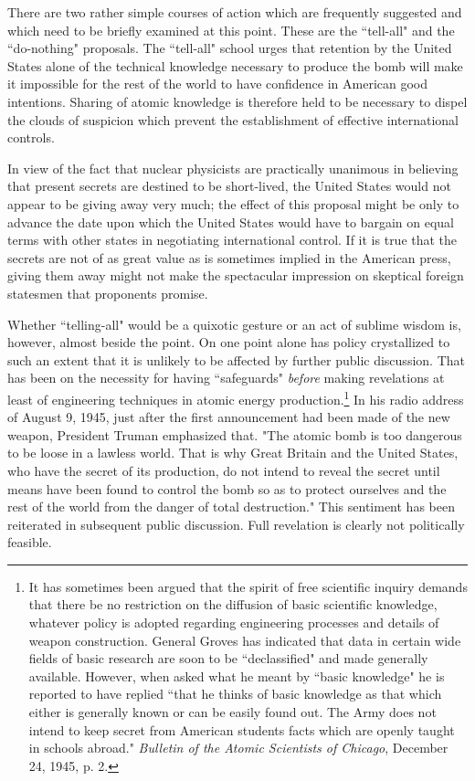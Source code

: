 There are two rather simple courses of action which are frequently suggested and which need to be briefly examined at this point. These are the ``tell-all" and the ``do-nothing" proposals. The ``tell-all" school urges that retention by the United States alone of the technical knowledge necessary to produce the bomb will make it impossible for the rest of the world to have confidence in American good intentions. Sharing of atomic knowledge is therefore held to be necessary to dispel the clouds of suspicion which prevent the establishment of effective international controls.

In view of the fact that nuclear physicists are practically unanimous in believing that present secrets are destined to be short-lived, the United States would not appear to be giving away very much; the effect of this proposal might be only to advance the date upon which the United States would have to bargain on equal terms with other states in negotiating international control. If it is true that the secrets are not of as great value as is sometimes implied in the American press, giving them away might not make the spectacular impression on skeptical foreign statesmen that proponents promise.

Whether ``telling-all" would be a quixotic gesture or an act of sublime wisdom is, however, almost beside the point. On one point alone has policy crystallized to such an extent that it is unlikely to be affected by further
public discussion. That has been on the necessity for having ``safeguards" \emph{before} making revelations at least of engineering techniques in atomic energy production.\footnote{It has sometimes been argued that the spirit of free scientific inquiry demands that there be no restriction on the diffusion of basic scientific knowledge, whatever policy is adopted regarding engineering processes and details of weapon construction. General Groves has indicated that data in certain wide fields of basic research are soon to be ``declassified" and made generally available. However, when asked what he meant by ``basic knowledge" he is reported to have replied ``that he thinks of basic knowledge as that which either is generally known or can be easily found out. The Army does not intend to keep secret from American students facts which are openly taught in schools abroad." \textit{Bulletin of the Atomic Scientists of Chicago}, December 24, 1945, p. 2.} In his radio address of August 9, 1945, just after the first announcement had been made of the new weapon, President Truman emphasized that. "The atomic bomb is too dangerous to be loose in a lawless world. That is why Great Britain and the United States, who have the secret of its production, do not intend to reveal the secret until means have been found to control the bomb so as to protect ourselves and the rest of the world from the danger of total destruction." This sentiment has been reiterated in subsequent public discussion. Full revelation is clearly not politically feasible.

